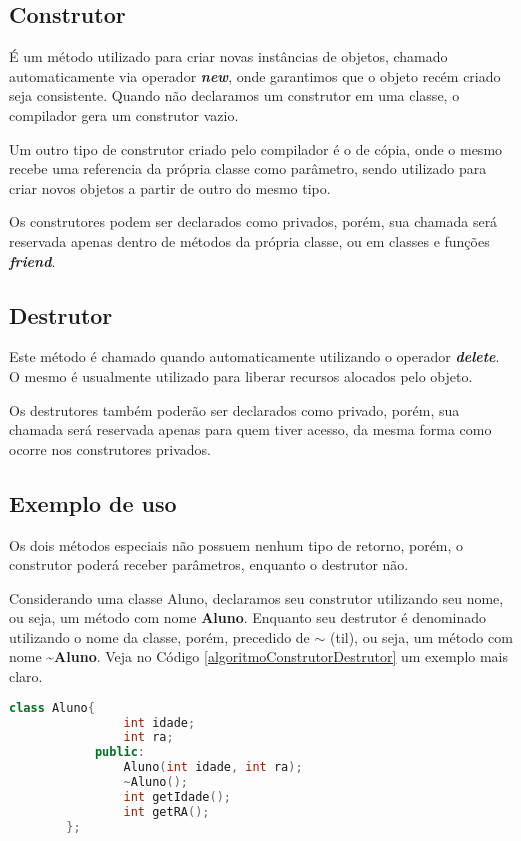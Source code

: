 \documentclass[a4paper, 12pt]{article}
\begin{document}
	\subsection{Construtor}
	
	É um método utilizado para criar novas instâncias de objetos, chamado automaticamente via operador \textbf{\textit{new}}, onde garantimos que o objeto recém criado seja consistente. Quando não declaramos um construtor em uma classe, o compilador gera um construtor vazio. 
	
	Um outro tipo de construtor criado pelo compilador é o de cópia, onde o mesmo recebe uma referencia da própria classe como parâmetro, sendo utilizado para criar novos objetos a partir de outro do mesmo tipo.
	
	Os construtores podem ser declarados como privados, porém, sua chamada será reservada apenas dentro de métodos da própria classe, ou em classes e funções \textbf{\textit{friend}}.
	
	\subsection{Destrutor}
	
	Este método é chamado quando automaticamente utilizando o operador \textbf{\textit{delete}}. O mesmo é usualmente utilizado para liberar recursos alocados pelo objeto.
	
	Os destrutores também poderão ser declarados como privado, porém, sua chamada será reservada apenas para quem tiver acesso, da mesma forma como ocorre nos construtores privados.
	
	\subsection{Exemplo de uso}
	
	Os dois métodos especiais não possuem nenhum tipo de retorno, porém, o construtor poderá receber parâmetros, enquanto o destrutor não.
	
	Considerando uma classe Aluno, declaramos seu construtor utilizando seu nome, ou seja, um método com nome \textbf{Aluno}. Enquanto seu destrutor é denominado utilizando o nome da classe, porém, precedido de $\sim$ (til), ou seja, um método com nome \textbf{\textasciitilde Aluno}. Veja no Código \ref{algoritmoConstrutorDestrutor} um exemplo mais claro.
	
	\begin{lstlisting}[language=C++, style=mystyle, caption={Exemplo de declaração do construtor e destrutor.}, label=algoritmoConstrutorDestrutor, extendedchars=true]		
		class Aluno{
				int idade;
				int ra;
			public:
				Aluno(int idade, int ra);
				~Aluno();
				int getIdade();
				int getRA();
		};
	\end{lstlisting}
	
\end{document}
